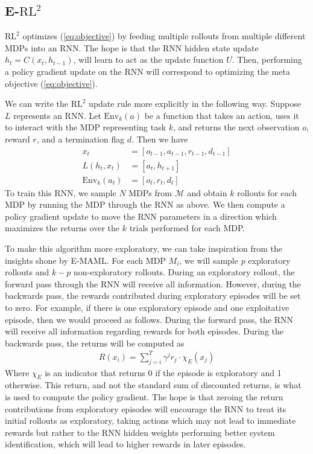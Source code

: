 \documentclass{article} %
\begin{document}
\subsection{E-$\text{RL}^2$}

$\text{RL}^2$ optimizes (\ref{eq:objective}) by feeding multiple rollouts from multiple different MDPs into an RNN. The hope is that the RNN hidden state update $h_t = C(x_t, h_{t-1})$, will learn to act as the update function $U$. Then, performing a policy gradient update on the RNN will correspond to optimizing the meta objective (\ref{eq:objective}). 

We can write the $\text{RL}^2$ update rule more explicitly in the following way. Suppose $L$ represents an RNN. Let $\text{Env}_k(a)$ be a function that takes an action, uses it to interact with the MDP representing task $k$, and returns the next observation $o$, reward $r$, and a termination flag $d$. Then we have 
\begin{align}
    x_t &= \left[o_{t-1}, a_{t-1}, r_{t-1}, d_{t-1} \right] \\
    L(h_t, x_t) &= \left[ a_t, h_{t+1}\right] \\
    \text{Env}_k(a_t) &= \left[ o_t, r_t, d_t \right]
\end{align}
To train this RNN, we sample $N$ MDPs from $\mathcal{M}$ and obtain $k$ rollouts for each MDP by running the MDP through the RNN as above. We then compute a policy gradient update to move the RNN parameters in a direction which maximizes the returns over the $k$ trials performed for each MDP. 

To make this algorithm more exploratory, we can take inspiration from the insights shone by E-MAML. For each MDP $M_i$, we will sample $p$ exploratory rollouts and $k-p$ non-exploratory rollouts. During an exploratory rollout, the forward pass through the RNN will receive all information. However, during the backwards pass, the rewards contributed during exploratory episodes will be set to zero. For example, if there is one exploratory episode and one exploitative episode, then we would proceed as follows. During the forward pass, the RNN will receive all information regarding rewards for both episodes. During the backwards pass, the returns will be computed as
\begin{align}
    R(x_i) = \sum_{j=i}^{T} \gamma^j r_j \cdot \chi_E(x_j)
\end{align}
Where $\chi_E$ is an indicator that returns 0 if the episode is exploratory and 1 otherwise. This return, and not the standard sum of discounted returns, is what is used to compute the policy gradient. The hope is that zeroing the return contributions from exploratory episodes will encourage the RNN to treat its initial rollouts as exploratory, taking actions which may not lead to immediate rewards but rather to the RNN hidden weights performing better system identification, which will lead to higher rewards in later episodes.     
\end{document}
